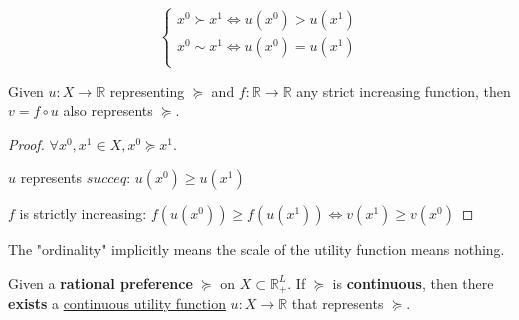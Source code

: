 \begin{proposition}
    \[
        \left\{\begin{array}{l}
            x^0 \succ x^1 \iff u(x^0) > u(x^1) \\
            x^0 \sim x^1 \iff u(x^0) = u(x^1)  \\
        \end{array}\right.
    \]
\end{proposition}

\begin{proposition}[ordinality]
    Given $u: X \longrightarrow \mathbb{R}$ representing $\succeq $ and $f: \mathbb{R} \longrightarrow \mathbb{R}$ any strict increasing function, then $v = f \circ u$ also represents $\succeq $.
\end{proposition}

\begin{proof}
    $\forall x^0,x^1 \in X, x^0 \succeq x^1$.

    $u$ represents $succeq$: $u(x^0) \geq u(x^1)$

    $f$ is strictly increasing: $f(u(x^0)) \geq f(u(x^1)) \iff v(x^1) \geq v(x^0)$
\end{proof}

\begin{remark*}
    The "ordinality" implicitly means the scale of the utility function means nothing.
\end{remark*}

\begin{theorem}[Debreu's]
    Given a \textbf{rational preference} $\succeq$ on $X \subset \mathbb{R}^{L}_{+}$. If $\succeq $ is \textbf{continuous}, then there \textbf{exists} a \underline{continuous utility function} $u: X \longrightarrow \mathbb{R}$ that represents $\succeq $.
\end{theorem}

